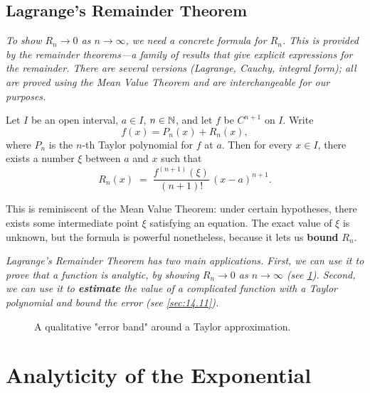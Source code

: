 \subsection*{Lagrange's Remainder Theorem}

\textit{To show $R_{n}\to 0$ as $n\to\infty$, we need a concrete formula for $R_{n}$.  This is provided by the remainder theorems---a family of results that give explicit expressions for the remainder.  There are several versions (Lagrange, Cauchy, integral form); all are proved using the Mean Value Theorem and are interchangeable for our purposes.}

\begin{theorem}
\label{thm:14-4}
Let $I$ be an open interval, $a\in I$, $n\in\mathbb{N}$, and let $f$ be $C^{n+1}$ on $I$.  Write
\[
  f(x) = P_{n}(x) + R_{n}(x),
\]
where $P_{n}$ is the $n$-th Taylor polynomial for $f$ at $a$.  Then for every $x\in I$, there exists a number $\xi$ between $a$ and $x$ such that
\[
  R_{n}(x) \;=\; \frac{f^{(n+1)}(\xi)}{(n+1)!}\,(x-a)^{n+1}.
\]
\end{theorem}

\begin{remark}
This is reminiscent of the Mean Value Theorem: under certain hypotheses, there exists some intermediate point $\xi$ satisfying an equation.  The exact value of $\xi$ is unknown, but the formula is powerful nonetheless, because it lets us \textbf{bound} $R_{n}$.
\end{remark}

\textit{Lagrange's Remainder Theorem has two main applications.  First, we can use it to prove that a function is analytic, by showing $R_{n}\to 0$ as $n\to\infty$ (see \cref{sec:14.8}).  Second, we can use it to \textbf{estimate} the value of a complicated function with a Taylor polynomial and bound the error (see \cref{sec:14.11}).}

\begin{figure}[ht]
  \centering
  
  \caption{A qualitative "error band" around a Taylor approximation.}
  \label{fig:taylor-remainder-band}
\end{figure}

\section{Analyticity of the Exponential}
\label{sec:14.8}

